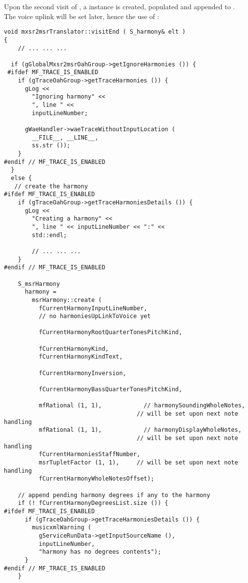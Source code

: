 Upon the second visit of , a  instance is created, populated and appended to .\\
The voice uplink will be set later, hence the use of :
\begin{lstlisting}[language=CPlusPlus]
void mxsr2msrTranslator::visitEnd ( S_harmony& elt )
{
	// ... ... ...

  if (gGlobalMxsr2msrOahGroup->getIgnoreHarmonies ()) {
 #ifdef MF_TRACE_IS_ENABLED
    if (gTraceOahGroup->getTraceHarmonies ()) {
      gLog <<
        "Ignoring harmony" <<
        ", line " <<
        inputLineNumber;

      gWaeHandler->waeTraceWithoutInputLocation (
        __FILE__, __LINE__,
        ss.str ());
    }
#endif // MF_TRACE_IS_ENABLED
  }
  else {
   // create the harmony
#ifdef MF_TRACE_IS_ENABLED
    if (gTraceOahGroup->getTraceHarmoniesDetails ()) {
      gLog <<
        "Creating a harmony" <<
        ", line " << inputLineNumber << ":" <<
        std::endl;

    	// ... ... ...
    }
#endif // MF_TRACE_IS_ENABLED

    S_msrHarmony
      harmony =
        msrHarmony::create (
          fCurrentHarmonyInputLineNumber,
          // no harmoniesUpLinkToVoice yet

          fCurrentHarmonyRootQuarterTonesPitchKind,

          fCurrentHarmonyKind,
          fCurrentHarmonyKindText,

          fCurrentHarmonyInversion,

          fCurrentHarmonyBassQuarterTonesPitchKind,

          mfRational (1, 1),            // harmonySoundingWholeNotes,
                                      // will be set upon next note handling
          mfRational (1, 1),            // harmonyDisplayWholeNotes,
                                      // will be set upon next note handling
          fCurrentHarmoniesStaffNumber,
          msrTupletFactor (1, 1),     // will be set upon next note handling
          fCurrentHarmonyWholeNotesOffset);

    // append pending harmony degrees if any to the harmony
    if (! fCurrentHarmonyDegreesList.size ()) {
#ifdef MF_TRACE_IS_ENABLED
      if (gTraceOahGroup->getTraceHarmoniesDetails ()) {
        musicxmlWarning (
          gServiceRunData->getInputSourceName (),
          inputLineNumber,
          "harmony has no degrees contents");
      }
#endif // MF_TRACE_IS_ENABLED
    }


\end{lstlisting}
